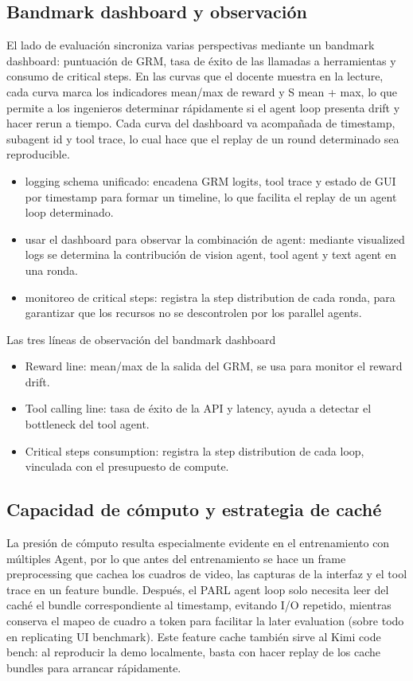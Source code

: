 \subsection{Bandmark dashboard y observación}
El lado de evaluación sincroniza varias perspectivas mediante un bandmark dashboard: puntuación de GRM, tasa de éxito de las llamadas a herramientas y consumo de critical steps. En las curvas que el docente muestra en la lecture, cada curva marca los indicadores mean/max de reward y S mean + max, lo que permite a los ingenieros determinar rápidamente si el agent loop presenta drift y hacer rerun a tiempo. Cada curva del dashboard va acompañada de timestamp, subagent id y tool trace, lo cual hace que el replay de un round determinado sea reproducible.
\begin{itemize}
    \item logging schema unificado: encadena GRM logits, tool trace y estado de GUI por timestamp para formar un timeline, lo que facilita el replay de un agent loop determinado.
    \item usar el dashboard para observar la combinación de agent: mediante visualized logs se determina la contribución de vision agent, tool agent y text agent en una ronda.
    \item monitoreo de critical steps: registra la step distribution de cada ronda, para garantizar que los recursos no se descontrolen por los parallel agents.
\end{itemize}

\begin{knowledgebox}{Las tres líneas de observación del bandmark dashboard}
\begin{itemize}
    \item Reward line: mean/max de la salida del GRM, se usa para monitor el reward drift.
    \item Tool calling line: tasa de éxito de la API y latency, ayuda a detectar el bottleneck del tool agent.
    \item Critical steps consumption: registra la step distribution de cada loop, vinculada con el presupuesto de compute.
\end{itemize}
\end{knowledgebox}

\subsection{Capacidad de cómputo y estrategia de caché}
La presión de cómputo resulta especialmente evidente en el entrenamiento con múltiples Agent, por lo que antes del entrenamiento se hace un frame preprocessing que cachea los cuadros de video, las capturas de la interfaz y el tool trace en un feature bundle. Después, el PARL agent loop solo necesita leer del caché el bundle correspondiente al timestamp, evitando I/O repetido, mientras conserva el mapeo de cuadro a token para facilitar la later evaluation (sobre todo en replicating UI benchmark). Este feature cache también sirve al Kimi code bench: al reproducir la demo localmente, basta con hacer replay de los cache bundles para arrancar rápidamente.

